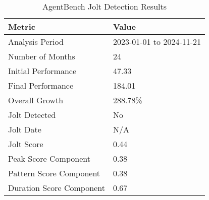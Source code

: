 
\begin{table}[ht]
\centering
\caption{AgentBench Jolt Detection Results}
\label{tab:agentbench_jolt}
\begin{tabular}{ll}
\toprule
\textbf{Metric} & \textbf{Value} \\
\midrule
Analysis Period & 2023-01-01 to 2024-11-21 \\
Number of Months & 24 \\
Initial Performance & 47.33 \\
Final Performance & 184.01 \\
Overall Growth & 288.78\% \\
\midrule
Jolt Detected & No \\
Jolt Date & N/A \\
Jolt Score & 0.44 \\
\midrule
Peak Score Component & 0.38 \\
Pattern Score Component & 0.38 \\
Duration Score Component & 0.67 \\
\bottomrule
\end{tabular}
\end{table}
